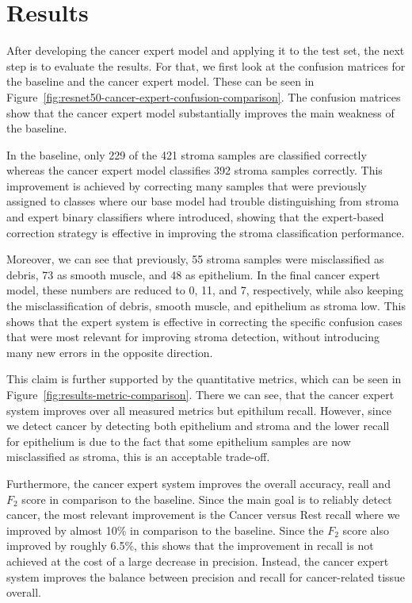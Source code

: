 \section{Results}
After developing the cancer expert model and applying it to the test set, the
next step is to evaluate the results. For that, we first look at the confusion
matrices for the baseline and the cancer expert model. These can be seen in
Figure~\ref{fig:resnet50-cancer-expert-confusion-comparison}. The confusion
matrices show that the cancer expert model substantially improves the main
weakness of the baseline.


In the baseline, only 229 of the 421 stroma samples are classified correctly
whereas the cancer expert model classifies 392 stroma samples correctly. This
improvement is achieved by correcting many samples that were previously assigned
to classes where our base model had trouble distinguishing from stroma and
expert binary classifiers where introduced, showing that the expert-based
correction strategy is effective in improving the stroma classification
performance.

Moreover, we can see that previously, 55 stroma samples were misclassified as
debris, 73 as smooth muscle, and 48 as epithelium. In the final cancer expert 
model, these numbers are reduced to 0, 11, and 7, respectively, while also
keeping the misclassification of debris, smooth muscle, and epithelium as stroma
low. This shows that the expert system is effective in correcting the specific
confusion cases that were most relevant for improving stroma detection, without
introducing many new errors in the opposite direction.

This claim is further supported by the quantitative metrics, which can be seen
in Figure~\ref{fig:results-metric-comparison}. There we can see, that the
cancer expert system improves over all measured metrics but epithilum recall.
However, since we detect cancer by detecting both epithelium and stroma and the
lower recall for epithelium is due to the fact that some epithelium samples are
now misclassified as stroma, this is an acceptable trade-off.


Furthermore, the cancer expert system improves the overall accuracy, reall and
$F_2$ score in comparison to the baseline. Since the main goal is to reliably
detect cancer, the most relevant improvement is the Cancer versus Rest recall
where we improved by almost 10\% in comparison to the baseline. Since the $F_2$
score also improved by roughly 6.5\%, this shows that the improvement in recall
is not achieved at the cost of a large decrease in precision. Instead, the
cancer expert system improves the balance between precision and recall for
cancer-related tissue overall.

